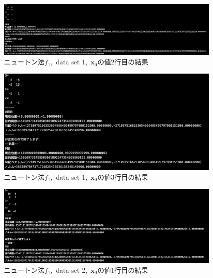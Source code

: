 \documentclass[12pt]{jarticle}
\begin{document}
\clearpage
\begin{figure}[h]
    \begin{center}
        \includegraphics[scale=0.2]{kadai1_1n_out1_2_1.png}
    \end{center}
    \caption{ニュートン法$f_1$,\ data set 1,\ $\boldsymbol{x}_0$の値2行目の結果}
\end{figure}

\begin{figure}[h]
    \begin{center}
        \includegraphics[scale=0.3]{kadai1_1n_out1_3_1.png}
    \end{center}
    \caption{ニュートン法$f_1$,\ data set 1,\ $\boldsymbol{x}_0$の値3行目の結果}
\end{figure}

\clearpage
\begin{figure}[h]
    \begin{center}
        \includegraphics[scale=0.2]{kadai1_1n_out2_1_1.png}
    \end{center}
    \caption{ニュートン法$f_1$,\ data set 2,\ $\boldsymbol{x}_0$の値1行目の結果}
\end{figure}
\end{document}
